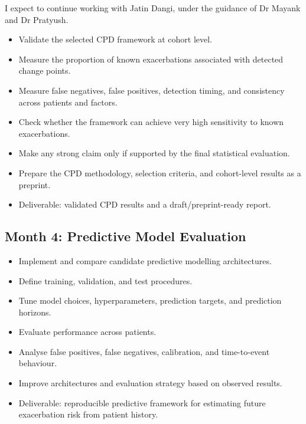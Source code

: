 \documentclass[10pt,a4paper]{article}
\begin{document}
I expect to continue working with Jatin Dangi, under the guidance of Dr Mayank and Dr Pratyush.

\begin{itemize}
    \item Validate the selected CPD framework at cohort level.
    \item Measure the proportion of known exacerbations associated with detected change points.
    \item Measure false negatives, false positives, detection timing, and consistency across patients and factors.
    \item Check whether the framework can achieve very high sensitivity to known exacerbations.
    \item Make any strong claim only if supported by the final statistical evaluation.
    \item Prepare the CPD methodology, selection criteria, and cohort-level results as a preprint.
    \item Deliverable: validated CPD results and a draft/preprint-ready report.
\end{itemize}

\subsection{Month 4: Predictive Model Evaluation}

\begin{itemize}
    \item Implement and compare candidate predictive modelling architectures.
    \item Define training, validation, and test procedures.
    \item Tune model choices, hyperparameters, prediction targets, and prediction horizons.
    \item Evaluate performance across patients.
    \item Analyse false positives, false negatives, calibration, and time-to-event behaviour.
    \item Improve architectures and evaluation strategy based on observed results.
    \item Deliverable: reproducible predictive framework for estimating future exacerbation risk from patient history.
\end{itemize}
\end{document}
